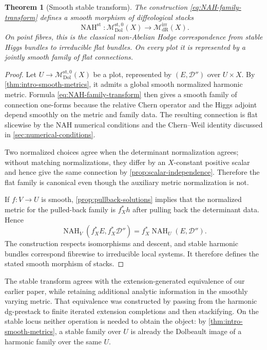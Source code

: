 \documentclass[11pt,reqno]{amsart}
\newtheorem{theorem}{Theorem}[section]
\theoremstyle{definition}
\theoremstyle{remark}
\newcommand{\cD}{\mathcal D}
\newcommand{\Dol}{\mathrm{Dol}}
\newcommand{\dR}{\mathrm{dR}}
\newcommand{\st}{\mathrm{st}}
\newcommand{\irr}{\mathrm{irr}}
\newcommand{\MdiffDol}{\mathscr M_{\Dol}}
\newcommand{\MdiffdR}{\mathscr M_{\dR}}
\begin{document}
\begin{theorem}[Smooth stable transform]\label{thm:smooth-stable-transform}
The construction \eqref{eq:NAH-family-transform} defines a smooth morphism of diffeological stacks
\begin{equation}\label{eq:smooth-stack-map}
  \operatorname{NAH}^{\st}:
  \MdiffDol^{\st,0}(X)
  \longrightarrow
  \MdiffdR^{\irr}(X).
\end{equation}
On point fibres, this is the classical non-Abelian Hodge correspondence from stable Higgs bundles to irreducible flat bundles.  On every plot it is represented by a jointly smooth family of flat connections.
\end{theorem}

\begin{proof}
Let $U\to\MdiffDol^{\st,0}(X)$ be a plot, represented by $(E,\cD'')$ over $U\times X$.  By \cref{thm:intro-smooth-metrics}, it admits a global smooth normalized harmonic metric.  Formula \eqref{eq:NAH-family-transform} then gives a smooth family of connection one-forms because the relative Chern operator and the Higgs adjoint depend smoothly on the metric and family data.  The resulting connection is flat slicewise by the NAH numerical conditions and the Chern--Weil identity discussed in \cref{sec:numerical-conditions}.

Two normalized choices agree when the determinant normalization agrees; without matching normalizations, they differ by an $X$-constant positive scalar and hence give the same connection by \cref{prop:scalar-independence}.  Therefore the flat family is canonical even though the auxiliary metric normalization is not.

If $f:V\to U$ is smooth, \cref{prop:pullback-solutions} implies that the normalized metric for the pulled-back family is $f_X^*h$ after pulling back the determinant data.  Hence
\[
  \operatorname{NAH}_V(f_X^*E,f_X^*\cD'')
  =f_X^*\operatorname{NAH}_U(E,\cD'').
\]
The construction respects isomorphisms and descent, and stable harmonic bundles correspond fibrewise to irreducible local systems.  It therefore defines the stated smooth morphism of stacks.
\end{proof}


The stable transform agrees with the extension-generated equivalence of
our earlier paper, while retaining additional analytic information in
the smoothly varying metric.  That equivalence was constructed by
passing from the harmonic dg-prestack to finite iterated extension
completions and then stackifying.  On the stable locus neither operation
is needed to obtain the object: by \cref{thm:intro-smooth-metrics}, a
stable family over $U$ is already the Dolbeault image of a harmonic
family over the same $U$.
\end{document}
